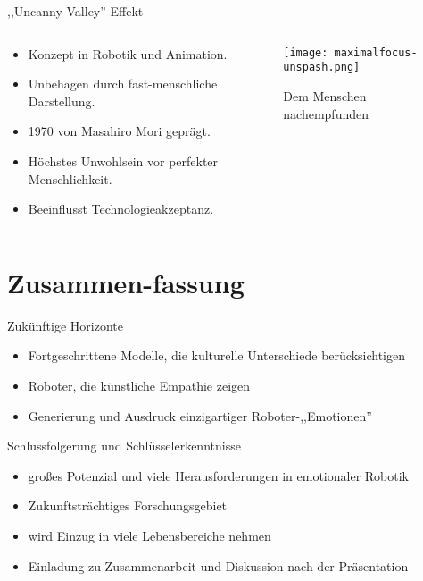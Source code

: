 \documentclass[aspectratio=169]{beamer}
\begin{document}
\begin{frame}{,,Uncanny Valley'' Effekt}
  \begin{columns}
    \begin{column}{0.7\textwidth}
      \begin{itemize}
        \item Konzept in Robotik und Animation.
        \item Unbehagen durch fast-menschliche Darstellung.
        \item 1970 von Masahiro Mori geprägt.
        \item Höchstes Unwohlsein vor perfekter Menschlichkeit.
        \item Beeinflusst Technologieakzeptanz.
      \end{itemize}
    \end{column}
    \begin{column}{0.3\textwidth}
      \begin{figure}[h]
        \centering
        \texttt{[image: maximalfocus-unspash.png]}
        \caption{Dem Menschen nachempfunden}
      \end{figure}
    \end{column}
  \end{columns}
\end{frame}

\section{Zusammen-fassung}
\begin{frame}{Zukünftige Horizonte}
  \begin{itemize}
    \item Fortgeschrittene Modelle, die kulturelle Unterschiede berücksichtigen
    \item Roboter, die künstliche Empathie zeigen
    \item Generierung und Ausdruck einzigartiger Roboter-,,Emotionen''
  \end{itemize}
\end{frame}
\begin{frame}{Schlussfolgerung und Schlüsselerkenntnisse}
  \begin{itemize}
    \item großes Potenzial und viele Herausforderungen in emotionaler Robotik
    \item Zukunftsträchtiges Forschungsgebiet
    \item wird Einzug in viele Lebensbereiche nehmen
    \item Einladung zu Zusammenarbeit und Diskussion nach der Präsentation
  \end{itemize}
\end{frame}
\end{document}
